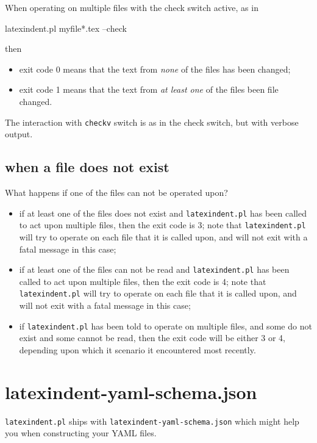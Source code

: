 		When operating on multiple files with the check switch active, as in
		\begin{commandshell}
latexindent.pl myfile*.tex --check
        \end{commandshell}
		then
		\begin{itemize}
			\item exit code 0 means that the text from \emph{none} of the files has been changed;
			\item exit code 1 means that the text from \emph{at least one} of the files been file changed.
		\end{itemize}

		The interaction with \texttt{checkv} switch is as in the check switch, but with verbose
		output.

	\subsection{when a file does not exist}
		What happens if one of the files can not be operated upon?
		\begin{itemize}
			\item if at least one of the files does not exist and \texttt{latexindent.pl} has been called
			      to act upon multiple files, then the exit code is 3; note that \texttt{latexindent.pl}
			      will try to operate on each file that it is called upon, and will not exit with a fatal
			      message in this case;
			\item if at least one of the files can not be read and \texttt{latexindent.pl} has been called
			      to act upon multiple files, then the exit code is 4; note that \texttt{latexindent.pl}
			      will try to operate on each file that it is called upon, and will not exit with a fatal
			      message in this case;
			\item if \texttt{latexindent.pl} has been told to operate on multiple files, and some do not
			      exist and some cannot be read, then the exit code will be either 3 or 4, depending upon
			      which it scenario it encountered most recently.
		\end{itemize}

	\section{latexindent-yaml-schema.json}

	 \texttt{latexindent.pl}
	  ships with
	 \texttt{latexindent-yaml-schema.json}
	 which might help you when constructing your YAML files.

